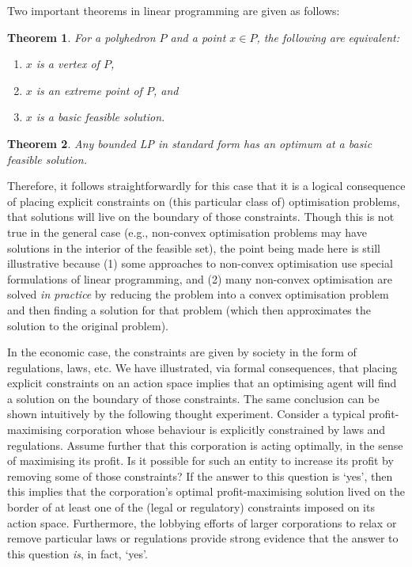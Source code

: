 \documentclass{amsart}
\theoremstyle{indented}
\theoremstyle{indentedProp}
\theoremstyle{indented}
\theoremstyle{indented}
\theoremstyle{indented}
\newtheorem{theorem}{Theorem}[section]
\theoremstyle{indented}
\theoremstyle{indented}
\begin{document}
Two important theorems in linear programming are given as follows:
\begin{theorem}
    For a polyhedron $P$ and a point $x\in P$, the following are equivalent:
    \begin{enumerate}
        \item $x$ is a {\it vertex} of $P$,
        \item $x$ is an {\it extreme point} of $P$, and
        \item $x$ is a {\it basic feasible solution}.
    \end{enumerate}
\end{theorem}
\begin{theorem}
    Any bounded LP in standard form has an optimum at a basic feasible solution.
\end{theorem}
Therefore, it follows straightforwardly for this case that it is a logical consequence of placing explicit constraints on (this particular class of) optimisation problems, that solutions will live on the boundary of those constraints. Though this is not true in the general case (e.g., non-convex optimisation problems may have solutions in the interior of the feasible set), the point being made here is still illustrative because (1) some approaches to non-convex optimisation use special formulations of linear programming, and (2) many non-convex optimisation are solved {\it in practice} by reducing the problem into a convex optimisation problem and then finding a solution for that problem (which then approximates the solution to the original problem).

In the economic case, the constraints are given by society in the form of regulations, laws, etc. We have illustrated, via formal consequences, that placing explicit constraints on an action space implies that an optimising agent will find a solution on the boundary of those constraints. The same conclusion can be shown intuitively by the following thought experiment. Consider a typical profit-maximising corporation whose behaviour is explicitly constrained by laws and regulations. Assume further that this corporation is acting optimally, in the sense of maximising its profit. Is it possible for such an entity to increase its profit by removing some of those constraints? If the answer to this question is `yes', then this implies that the  corporation's optimal profit-maximising solution lived on the border of at least one of the (legal or regulatory) constraints imposed on its action space. Furthermore, the lobbying efforts of larger corporations to relax or remove particular laws or regulations provide strong evidence that the answer to this question {\it is}, in fact, `yes'.
\end{document}
